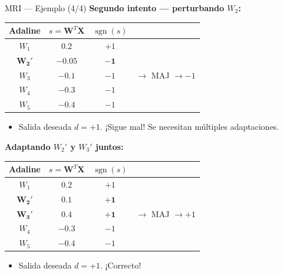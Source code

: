 \documentclass[aspectratio=169,utf8,spanish]{beamer}
\DeclareMathOperator{\sgn}{sgn}
\begin{document}
\begin{frame}{MRI — Ejemplo (4/4)}
  \textbf{Segundo intento — perturbando $W_2$:}
  \begin{center}
    \begin{tabular}{c|c|c|c}
      Adaline & $s = \mathbf{W}^T\mathbf{X}$ & $\sgn(s)$ & \\
      \hline
      $W_1$ & $0.2$ & $+1$ & \\
      $\mathbf{W_2'}$ & $\mathbf{-0.05}$ & $\mathbf{-1}$ & \\
      $W_3$ & $-0.1$ & $-1$ & $\to$ MAJ $\to -1$ \\
      $W_4$ & $-0.3$ & $-1$ & \\
      $W_5$ & $-0.4$ & $-1$ & \\
    \end{tabular}
  \end{center}
  \begin{itemize}
    \item Salida deseada $d = +1$. ¡Sigue mal! Se necesitan múltiples adaptaciones.
  \end{itemize}

  \textbf{Adaptando $W_2'$ y $W_3'$ juntos:}
  \begin{center}
    \begin{tabular}{c|c|c|c}
      Adaline & $s = \mathbf{W}^T\mathbf{X}$ & $\sgn(s)$ & \\
      \hline
      $W_1$ & $0.2$ & $+1$ & \\
      $\mathbf{W_2'}$ & $\mathbf{0.1}$ & $\mathbf{+1}$ & \\
      $\mathbf{W_3'}$ & $\mathbf{0.4}$ & $\mathbf{+1}$ & $\to$ MAJ $\to +1$ \\
      $W_4$ & $-0.3$ & $-1$ & \\
      $W_5$ & $-0.4$ & $-1$ & \\
    \end{tabular}
  \end{center}
  \begin{itemize}
    \item Salida deseada $d = +1$. ¡Correcto!
  \end{itemize}
\end{frame}
\end{document}
